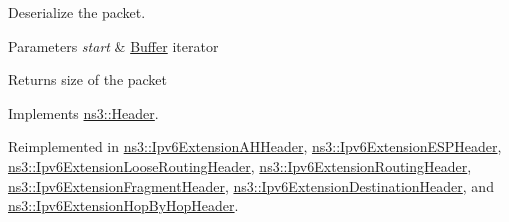 Deserialize the packet. 


\begin{DoxyParams}{Parameters}
{\em start} & \hyperlink{classns3_1_1Buffer}{Buffer} iterator \\
\hline
\end{DoxyParams}
\begin{DoxyReturn}{Returns}
size of the packet 
\end{DoxyReturn}


Implements \hyperlink{classns3_1_1Header_a78be9400bb66b2a8543606f395ef5396}{ns3\+::\+Header}.



Reimplemented in \hyperlink{classns3_1_1Ipv6ExtensionAHHeader_a5967c93fc818a0e3314f10f777c7c9c8}{ns3\+::\+Ipv6\+Extension\+A\+H\+Header}, \hyperlink{classns3_1_1Ipv6ExtensionESPHeader_afae36dcc2dcbd51b1a46dfef5d430142}{ns3\+::\+Ipv6\+Extension\+E\+S\+P\+Header}, \hyperlink{classns3_1_1Ipv6ExtensionLooseRoutingHeader_af1345d6ac6b777807f09c03471a4a635}{ns3\+::\+Ipv6\+Extension\+Loose\+Routing\+Header}, \hyperlink{classns3_1_1Ipv6ExtensionRoutingHeader_aa1084222d3efdae9d445ff8a5b00322a}{ns3\+::\+Ipv6\+Extension\+Routing\+Header}, \hyperlink{classns3_1_1Ipv6ExtensionFragmentHeader_ac665209cceae832687c23c0c664e5a5d}{ns3\+::\+Ipv6\+Extension\+Fragment\+Header}, \hyperlink{classns3_1_1Ipv6ExtensionDestinationHeader_afb09b5d3221279bc1fcad100aa950947}{ns3\+::\+Ipv6\+Extension\+Destination\+Header}, and \hyperlink{classns3_1_1Ipv6ExtensionHopByHopHeader_af366694cbc19cd319d8e65700a06082f}{ns3\+::\+Ipv6\+Extension\+Hop\+By\+Hop\+Header}.


